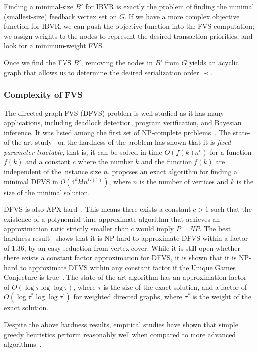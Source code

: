 Finding a minimal-size $B'$ for IBVR is exactly the problem of finding the minimal (smallest-size) feedback vertex set on $G$. If we have a more complex objective function for IBVR, we can push the objective function into the FVS computation; we assign weights to the nodes to represent the desired transaction priorities, and look for a minimum-weight FVS. 

Once we find the FVS $B'$, removing the nodes in $B'$ from $G$ yields an acyclic graph that allows us to determine the desired serialization order $\prec$.

\subsubsection{Complexity of FVS}\label{subsec:FVS_stateoftheart}

The directed graph FVS (DFVS) problem is well-studied as it has many applications, including deadlock detection, program verification, and Bayesian inference. 
It was listed among the first set of NP-complete problems~\cite{karp1972reducibility}. 
The state-of-the-art study~\cite{chen2008fixed} on the hardness of the problem has shown that it is \emph{fixed-parameter tractable}, that is, it can be solved in time $O(f(k)n^c)$ for a function $f(k)$ and a constant $c$ where the number $k$ and the function $f(k)$ are independent of the instance size $n$. \cite{chen2008fixed} proposes an exact algorithm for finding a minimal DFVS in $O(4^kk!n^{O(1)})$, where $n$ is the number of vertices and $k$ is the size of the minimal solution. 

DFVS is also APX-hard~\cite{kann1992approximability}. This means there exists a constant $c>1$ such that the existence of a polynomial-time approximate algorithm that achieves an approximation ratio strictly smaller than $c$ would imply $P=NP$. The best hardness result~\cite{dinur2005hardness} shows that it is NP-hard to approximate DFVS within a factor of 1.36, by an easy reduction from vertex cover. While it is still open whether there exists a constant factor approximation for DFVS, it is shown that it is NP-hard to approximate DFVS within any constant factor if the Unique Games Conjecture is true~\cite{guruswami2008beating}. The state-of-the-art algorithm has an approximation factor of $O(\log\tau\log\log\tau)$, where $\tau$ is the size of the exact solution, and a factor of $O(\log\tau^*\log\log\tau^*)$ for weighted directed graphs, where $\tau^*$ is the weight of the exact solution.

Despite the above hardness results, empirical studies have shown that simple greedy heuristics perform reasonably well when compared to more advanced algorithms~\cite{cutello2015targeting}. 

